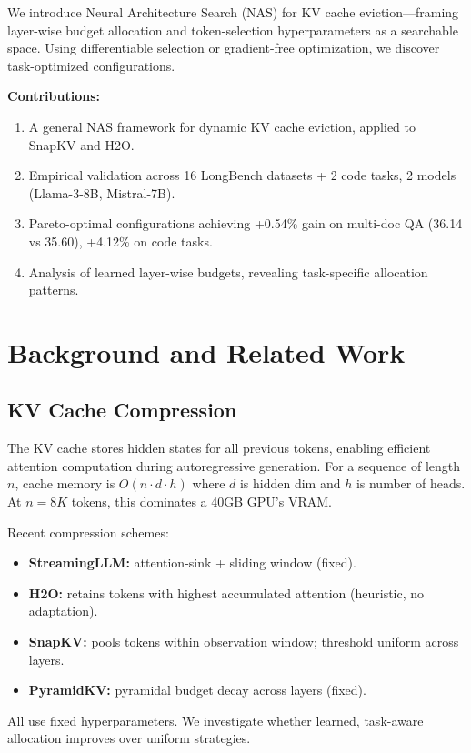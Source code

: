 \documentclass[11pt]{article}
\begin{document}
We introduce Neural Architecture Search (NAS) for KV cache eviction—framing layer-wise budget allocation and token-selection hyperparameters as a searchable space. Using differentiable selection or gradient-free optimization, we discover task-optimized configurations.

\textbf{Contributions:}
\begin{enumerate}
    \item A general NAS framework for dynamic KV cache eviction, applied to SnapKV and H2O.
    \item Empirical validation across 16 LongBench datasets + 2 code tasks, 2 models (Llama-3-8B, Mistral-7B).
    \item Pareto-optimal configurations achieving +0.54\% gain on multi-doc QA (36.14 vs 35.60), +4.12\% on code tasks.
    \item Analysis of learned layer-wise budgets, revealing task-specific allocation patterns.
\end{enumerate}

\section{Background and Related Work}

\subsection{KV Cache Compression}

The KV cache stores hidden states for all previous tokens, enabling efficient attention computation during autoregressive generation. For a sequence of length $n$, cache memory is $O(n \cdot d \cdot h)$ where $d$ is hidden dim and $h$ is number of heads. At $n=8K$ tokens, this dominates a 40GB GPU's VRAM.

Recent compression schemes:
\begin{itemize}
    \item \textbf{StreamingLLM:} attention-sink + sliding window (fixed).
    \item \textbf{H2O:} retains tokens with highest accumulated attention (heuristic, no adaptation).
    \item \textbf{SnapKV:} pools tokens within observation window; threshold uniform across layers.
    \item \textbf{PyramidKV:} pyramidal budget decay across layers (fixed).
\end{itemize}

All use fixed hyperparameters. We investigate whether learned, task-aware allocation improves over uniform strategies.
\end{document}

